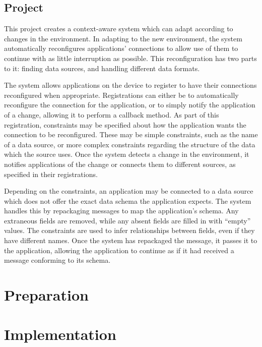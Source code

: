 \documentclass[12pt,twoside,notitlepage]{report}
\begin{document}
\section{Project}
This project creates a context-aware system which can adapt according to changes in the environment.\cite{Schilit:1994:CCA:1439278.1440041} 
In adapting to the new environment, the system automatically reconfigures applications' connections to allow use of them to continue with as little interruption as possible. 
This reconfiguration has two parts to it: finding data sources, and handling different data formats.

The system allows applications on the device to register to have their connections reconfigured when appropriate. 
Registrations can either be to automatically reconfigure the connection for the application, or to simply notify the application of a change, allowing it to perform a callback method.
As part of this registration, constraints may be specified about how the application wants the connection to be reconfigured. 
These may be simple constraints, such as the name of a data source, or more complex constraints regarding the structure of the data which the source uses. 
Once the system detects a change in the environment, it notifies applications of the change or connects them to different sources, as specified in their registrations.

Depending on the constraints, an application may be connected to a data source which does not offer the exact data schema the application expects. 
The system handles this by repackaging messages to map the application's schema. Any extraneous fields are removed, while any absent fields are filled in with ``empty'' values. The constraints are used to infer relationships between fields, even if they have different names. 
Once the system has repackaged the message, it passes it to the application, allowing the application to continue as if it had received a message conforming to its schema.

\cleardoublepage

 
\chapter{Preparation}


\cleardoublepage


\chapter{Implementation}
\end{document}
